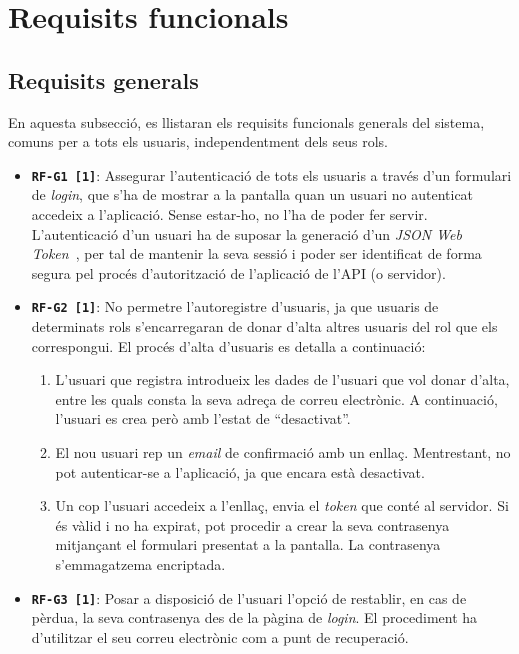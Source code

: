 \documentclass[a4paper,12pt]{ThesisStyle}
\begin{document}
\section{Requisits funcionals}
\label{sec:requisits_funcionals}

\subsection{Requisits generals}
\label{subsec:requisits_generals}

En aquesta subsecció, es llistaran els requisits funcionals generals del sistema, comuns per a tots els usuaris, independentment dels seus rols.

\begin{itemize}
  \item \texttt{\textbf{RF-G1 [1]}}: Assegurar l'autenticació de tots els usuaris a través d'un formulari de \textit{login}, que s'ha de mostrar a la pantalla quan un usuari no autenticat accedeix a l'aplicació. Sense estar-ho, no l'ha de poder fer servir. L'autenticació d'un usuari ha de suposar la generació d'un \textit{JSON Web Token}~\cite{JWT}, per tal de mantenir la seva sessió i poder ser identificat de forma segura pel procés d'autorització de l'aplicació de l'API (o servidor).
  \item \texttt{\textbf{RF-G2 [1]}}: No permetre l'autoregistre d'usuaris, ja que usuaris de determinats rols s'encarregaran de donar d'alta altres usuaris del rol que els correspongui. El procés d'alta d'usuaris es detalla a continuació:
        \begin{enumerate}
          \item L'usuari que registra introdueix les dades de l'usuari que vol donar d'alta, entre les quals consta la seva adreça de correu electrònic. A continuació, l'usuari es crea però amb l'estat de ``desactivat''.
          \item El nou usuari rep un \textit{email} de confirmació amb un enllaç. Mentrestant, no pot autenticar-se a l'aplicació, ja que encara està desactivat.
          \item Un cop l'usuari accedeix a l'enllaç, envia el \textit{token} que conté al servidor. Si és vàlid i no ha expirat, pot procedir a crear la seva contrasenya mitjançant el formulari presentat a la pantalla. La contrasenya s'emmagatzema encriptada.
        \end{enumerate}
  \item \texttt{\textbf{RF-G3 [1]}}: Posar a disposició de l'usuari l'opció de restablir, en cas de pèrdua, la seva contrasenya des de la pàgina de \textit{login}. El procediment ha d'utilitzar el seu correu electrònic com a punt de recuperació.

\end{itemize}
\end{document}
